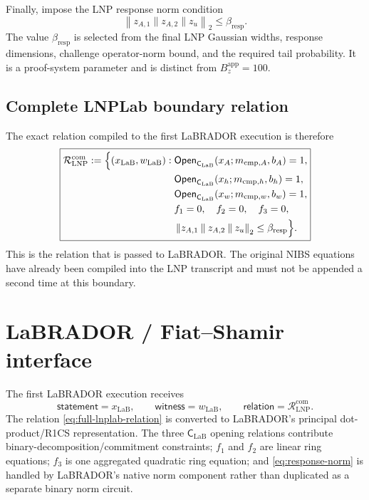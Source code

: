 \documentclass[11pt]{article}
\newcommand{\R}{\mathcal R}
\newcommand{\CLaB}{\mathsf C_{\mathrm{LaB}}}
\newcommand{\Open}{\mathsf{Open}}
\newcommand{\concat}{\mathbin\|}
\newcommand{\norm}[1]{\left\lVert #1\right\rVert}
\begin{document}
Finally, impose the LNP response norm condition
\begin{equation}
\boxed{
 \norm{z_{A,1}\concat z_{A,2}\concat z_u}_2
 \le \beta_{\mathrm{resp}}.
 }
 \label{eq:response-norm}
\end{equation}
The value $\beta_{\mathrm{resp}}$ is selected from the final LNP Gaussian
widths, response dimensions, challenge operator-norm bound, and the required
tail probability.  It is a proof-system parameter and is distinct from
$B_z^{\mathrm{app}}=100$.

\subsection{Complete LNPLab boundary relation}

The exact relation compiled to the first LaBRADOR execution is therefore
\begin{equation}
\boxed{
\begin{aligned}
\R_{\mathrm{LNP}}^{\mathrm{com}}
:=\Bigl\{(x_{\mathrm{LaB}},w_{\mathrm{LaB}}):\;&
 \Open_{\CLaB}(x_A;m_{\mathrm{cmp},A},b_A)=1,\\
&\Open_{\CLaB}(x_h;m_{\mathrm{cmp},h},b_h)=1,\\
&\Open_{\CLaB}(x_w;m_{\mathrm{cmp},w},b_w)=1,\\
&f_1=0,\quad f_2=0,\quad f_3=0,\\
&\norm{z_{A,1}\concat z_{A,2}\concat z_u}_2
   \le \beta_{\mathrm{resp}}
\Bigr\}.
\end{aligned}}
\label{eq:full-lnplab-relation}
\end{equation}
This is the relation that is passed to LaBRADOR.  The original NIBS equations
have already been compiled into the LNP transcript and must not be appended a
second time at this boundary.

\section{LaBRADOR / Fiat--Shamir interface}

The first LaBRADOR execution receives
\[
  \boxed{
  \textsf{statement}=x_{\mathrm{LaB}},
  \qquad
  \textsf{witness}=w_{\mathrm{LaB}},
  \qquad
  \textsf{relation}=\R_{\mathrm{LNP}}^{\mathrm{com}}.
  }
\]
The relation \eqref{eq:full-lnplab-relation} is converted to LaBRADOR's
principal dot-product/R1CS representation.  The three $\CLaB$ opening
relations contribute binary-decomposition/commitment constraints; $f_1$ and
$f_2$ are linear ring equations; $f_3$ is one aggregated quadratic ring
equation; and \eqref{eq:response-norm} is handled by LaBRADOR's native norm
component rather than duplicated as a separate binary norm circuit.
\end{document}
